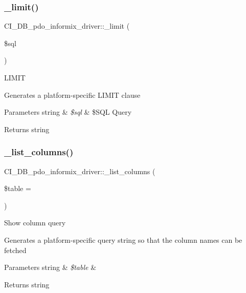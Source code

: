 \subsubsection{\texorpdfstring{\+\_\+limit()}{\_limit()}}
{\footnotesize\ttfamily C\+I\+\_\+\+D\+B\+\_\+pdo\+\_\+informix\+\_\+driver\+::\+\_\+limit (\begin{DoxyParamCaption}\item[{}]{\$sql }\end{DoxyParamCaption})\hspace{0.3cm}{\ttfamily [protected]}}

L\+I\+M\+IT

Generates a platform-\/specific L\+I\+M\+IT clause


\begin{DoxyParams}[1]{Parameters}
string & {\em \$sql} & \$\+S\+QL Query \\
\hline
\end{DoxyParams}
\begin{DoxyReturn}{Returns}
string 
\end{DoxyReturn}
\mbox{\label{class_c_i___d_b__pdo__informix__driver_ad3ac9c3f29e912d73c52d0619f118945}} 
\subsubsection{\texorpdfstring{\+\_\+list\+\_\+columns()}{\_list\_columns()}}
{\footnotesize\ttfamily C\+I\+\_\+\+D\+B\+\_\+pdo\+\_\+informix\+\_\+driver\+::\+\_\+list\+\_\+columns (\begin{DoxyParamCaption}\item[{}]{\$table = {\ttfamily \textquotesingle{}\textquotesingle{}} }\end{DoxyParamCaption})\hspace{0.3cm}{\ttfamily [protected]}}

Show column query

Generates a platform-\/specific query string so that the column names can be fetched


\begin{DoxyParams}[1]{Parameters}
string & {\em \$table} & \\
\hline
\end{DoxyParams}
\begin{DoxyReturn}{Returns}
string 
\end{DoxyReturn}
\mbox{\label{class_c_i___d_b__pdo__informix__driver_aedcf09674858fcecc7131e654af0d430}} 
